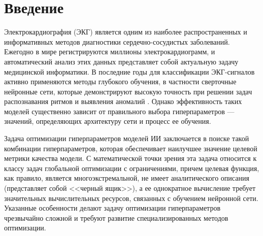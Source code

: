 \documentclass[11pt, oneside, a4paper]{article}
\begin{document}



\section{Введение}
\label{sec-intro}

Электрокардиография (ЭКГ) является одним из наиболее распространенных и информативных методов диагностики сердечно-сосудистых заболеваний. Ежегодно в мире регистрируются миллионы электрокардиограмм, и автоматический анализ этих данных представляет собой актуальную задачу медицинской информатики. В последние годы для классификации ЭКГ-сигналов активно применяются методы глубокого обучения, в частности сверточные нейронные сети, которые демонстрируют высокую точность при решении задач распознавания ритмов и выявления аномалий \cite{Ansari2023,  Seenivasan2025, Xiao2023, Huang2023}. Однако эффективность таких моделей существенно зависит от правильного выбора гиперпараметров --- значений, определяющих архитектуру сети и процесс ее обучения.

Задача оптимизации гиперпараметров моделей ИИ заключается в поиске такой комбинации гиперпараметров, которая обеспечивает наилучшее значение целевой метрики качества модели. С математической точки зрения эта задача относится к классу задач глобальной оптимизации с ограничениями, причем целевая функция, как правило, является многоэкстремальной, не имеет аналитического описания (представляет собой <<черный ящик>>), а ее однократное вычисление требует значительных вычислительных ресурсов, связанных с обучением нейронной сети. Указанные особенности делают задачу оптимизации гиперпараметров чрезвычайно сложной и требуют развитие специализированных методов оптимизации.
\end{document}
